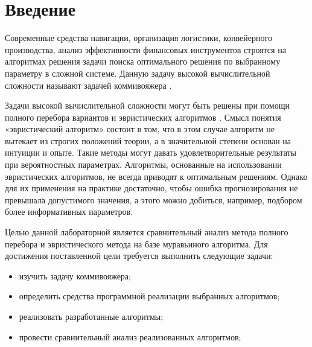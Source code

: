 \chapter*{Введение}

Современные средства навигации, организация логистики, конвейерного производства, анализ эффективности финансовых инструментов строятся на алгоритмах решения задачи поиска оптимального решения по выбранному параметру в сложной системе.
Данную задачу высокой вычислительной сложности называют задачей коммивояжера \cite{task}.

Задачи высокой вычислительной сложности могут быть решены при помощи полного перебора вариантов и эвристических алгоритмов \cite{evr}. Смысл понятия «эвристический алгоритм» состоит в том, что в этом случае алгоритм не вытекает из строгих положений теории, а в значительной степени основан на интуиции и опыте. Такие методы могут давать удовлетворительные результаты при вероятностных параметрах. Алгоритмы, основанные на использовании эвристических алгоритмов, не всегда приводят к оптимальным решениям. Однако для их применения на практике достаточно, чтобы ошибка прогнозирования не превышала допустимого значения, а этого можно добиться, например, подбором более информативных параметров.

Целью данной лабораторной является сравнительный анализ метода полного перебора и эвристического метода на базе муравьиного алгоритма. Для достижения поставленной цели требуется выполнить следующие задачи:

\begin{itemize}
	\item изучить задачу коммивояжера;
	\item определить средства программной реализации выбранных алгоритмов;
	\item реализовать разработанные алгоритмы;
	\item провести сравнительный анализ реализованных алгоритмов;
\end{itemize}
